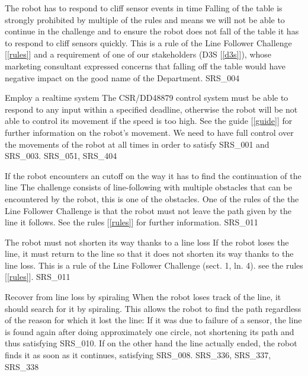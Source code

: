 \begin{itemize}
        {The robot has to respond to cliff sensor events in time}
        {Falling of the table is strongly prohibited by multiple of the rules and means we will not be able to continue in the challenge and to ensure the robot does not fall of the table it has to respond to cliff sensors quickly.}
        {This is a rule of the Line Follower Challenge [\ref{rules}] and a requirement of one of our stakeholders (D3S [\ref{d3s}]),
        whose marketing consultant expressed concerns that falling off the table would have negative impact on the good name of the Department.}
        {SRS\_004}

        {Employ a realtime system}
        {The CSR/DD48879 control system must be able to respond to any input within a specified deadline, otherwise the robot will be not able to control its movement if the speed is too high. See the guide [\ref{guide}] for further information on the robot's movement.}
        {We need to have full control over the movements of the robot at all times in order to satisfy SRS\_001 and SRS\_003.}
        {SRS\_051, SRS\_404}

        {If the robot encounters an cutoff on the way it has to find the continuation of the line}
        {The challenge consists of line-following with multiple obstacles that can be encountered by the robot, this is one of the obstacles.}
        {One of the rules of the the Line Follower Challenge is that the robot must not leave the path given by the line it follows. See the rules [\ref{rules}] for further information.}
        {SRS\_011}

        {The robot must not shorten its way thanks to a line loss}
        {If the robot loses the line, it must return to the line so that it does not shorten its way thanks to the line loss.}
        {This is a rule of the Line Follower Challenge (sect. 1, ln. 4). see the rules [\ref{rules}].}
        {SRS\_011}

        {Recover from line loss by spiraling}
        {When the robot loses track of the line, it should search for it by spiraling.}
        {This allows the robot to find the path regardless of the reason for which it lost the line:
        If it was due to failure of a sensor, the line is found again after doing approximately one circle,
        not shortening its path and thus satisfying SRS\_010. If on the other hand the line actually ended,
        the robot finds it as soon as it continues, satisfying SRS\_008.}
        {SRS\_336, SRS\_337, SRS\_338}


\end{itemize}
